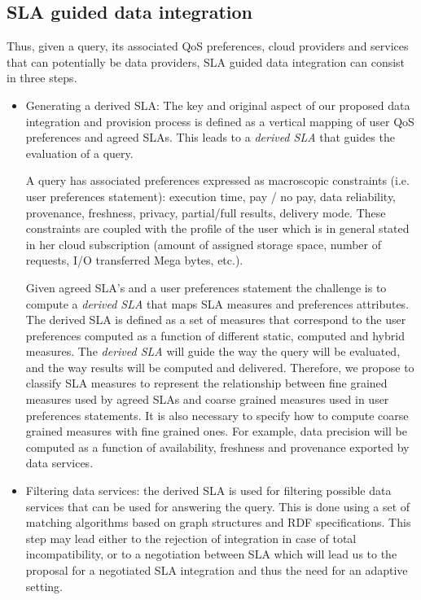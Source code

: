 \subsection{SLA guided data integration}
Thus, given a query, its associated QoS preferences, cloud providers  and  services that can potentially be data providers,  SLA guided data  integration can consist in three steps.  
\begin{itemize}
\item Generating a derived SLA:  
The key and original aspect of   our proposed data integration and provision process is  defined as a vertical mapping of user QoS preferences and agreed SLAs. This  leads to a {\em derived SLA} that guides the evaluation of a query. 

A query has associated preferences  expressed as macroscopic constraints (i.e. user preferences statement): execution time, pay / no pay, data reliability, provenance, freshness, privacy, partial/full results, delivery mode. These constraints are coupled with the profile of the user which is in general stated in her cloud subscription (amount of assigned storage space, number of requests, I/O transferred Mega bytes, etc.). 

Given agreed SLA's and a user preferences statement the challenge is to compute a  {\em derived SLA} that  maps SLA measures and preferences attributes.  The derived SLA is defined as a set of measures that correspond to the user preferences computed as a function of different static, computed and hybrid measures. The {\em derived SLA}  will guide the way the query will be evaluated, and the way results will be computed and delivered.
Therefore, we propose to classify SLA measures to represent the relationship between fine grained measures used by agreed SLAs and coarse grained measures used in user preferences statements. It is also necessary to specify how to compute coarse grained measures with fine grained ones. For example, data precision will be computed as a function of availability, freshness and provenance exported by data services. 

  
\item Filtering data services: the derived SLA  is used for filtering possible data services that can be used for answering the query. This is done using a set of matching algorithms based on  graph structures and RDF specifications. This step may lead either to the rejection of integration in case of total incompatibility, or to a negotiation between SLA which will lead us to the proposal for a negotiated SLA integration and thus the need for an adaptive setting.



\end{itemize}
